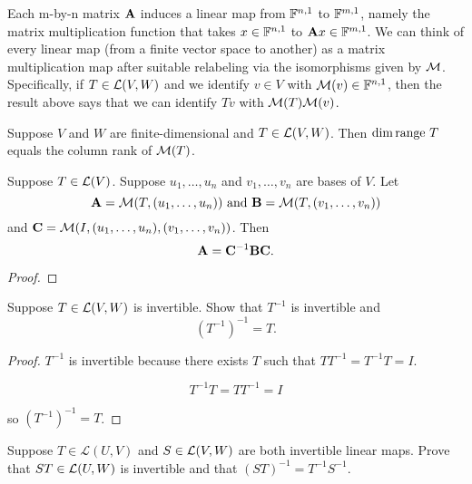 \documentclass{extarticle}
\begin{document}
\begin{remark}
    Each m-by-n matrix \(\mathbf{A}\) induces a linear map from \(\mathbb{F}^{n, 1}\) to \(\mathbb{F}^{m, 1}\), namely the matrix 
    multiplication function that takes \(x \in \mathbb{F}^{n, 1}\) to \(\mathbf{A} x \in \mathbb{F}^{m, 1}\). We can think of 
    every linear map (from a finite vector space to another) as a matrix multiplication map 
    after suitable relabeling via the isomorphisms given by \(\mathcal{M}\). Specifically, if \(T \in \mathcal{L}(V, W)\)
    and we identify \(v \in V\) with \(\mathcal{M}(v) \in \mathbb{F}^{n, 1}\), then the result above says that we 
    can identify \(Tv\) with \(\mathcal{M}(T) \mathcal{M}(v)\). 
\end{remark}

\begin{thm}
    Suppose \(V\) and \(W\) are finite-dimensional and \(T \in \mathcal{L}(V, W)\). Then \(\dim \text{range } T\)
    equals the column rank of \(\mathcal{M}(T)\). 
\end{thm}



\begin{thm}
    Suppose \(T \in \mathcal{L}(V)\). Suppose \(u_1, \ldots, u_n\) and \(v_1, \ldots, v_n\) are bases of 
    \(V\). Let 
    \[\mathbf{A} = \mathcal{M}(T, (u_1, \ldots, u_n)) \text{  and  } \mathbf{B} = \mathcal{M}(T, (v_1, \ldots, v_n))\]
    and \(\mathbf{C} = \mathcal{M}(I, (u_1, \ldots, u_n), (v_1, \ldots, v_n))\). Then 
    \[\mathbf{A} = \mathbf{C}^{-1} \mathbf{B} \mathbf{C}.\]
\end{thm}

\begin{proof}

\end{proof}
\begin{problem}{1}
    Suppose \(T \in \mathcal{L}(V, W)\) is invertible. Show that \(T^{-1}\) is invertible and 
    \[(T^{-1})^{-1} = T.\]
\end{problem}

\begin{proof}

    \(T^{-1}\) is invertible because there exists \(T\) such that \(T T^{-1} = T^{-1} T  = I\). 

\[T^{-1} T = TT^{-1} = I\]

so \((T^{-1})^{-1} = T\).
\end{proof}


\begin{problem}{2}
    Suppose \(T \in \mathcal{L}(U, V)\) and \(S \in \mathcal{L}(V, W)\) are both invertible linear maps. 
    Prove that \(ST \in \mathcal{L}(U, W)\) is invertible and that \((ST)^{-1} = T^{-1}S^{-1}\).
\end{problem}
\end{document}
